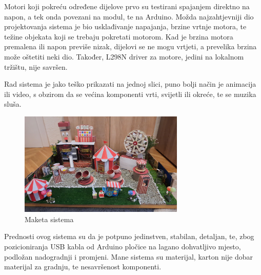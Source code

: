 Motori koji pokreću određene dijelove prvo su testirani spajanjem direktno na napon, a tek onda povezani na modul, te na Arduino. Možda najzahtjevniji dio projektovanja sistema je bio usklađivanje napajanja, brzine vrtnje motora, te težine objekata koji se trebaju pokretati motorom. Kad je brzina motora premalena ili napon previše nizak, dijelovi se ne mogu vrtjeti, a prevelika brzina može oštetiti neki dio. Također, L298N driver za motore, jedini na lokalnom tržištu, nije savršen.

Rad sistema je jako teško prikazati na jednoj slici, puno bolji način je animacija ili video, s obzirom da se većina komponenti vrti, svijetli ili okreće, te se muzika sluša. 

 \begin{figure}[h!]
  \centering
  \includegraphics[width=0.7\textwidth]{maketa3}
  \caption{Maketa sistema}
  \label{fig:Slika_Maketa}
\end{figure}

Prednosti ovog sistema su da je potpuno jedinstven, stabilan, detaljan, te, zbog pozicioniranja USB kabla od Arduino pločice na lagano dohvatljivo mjesto, podložan nadogradnji i promjeni. Mane sistema su materijal, karton nije dobar materijal za gradnju, te nesavršenost komponenti.
